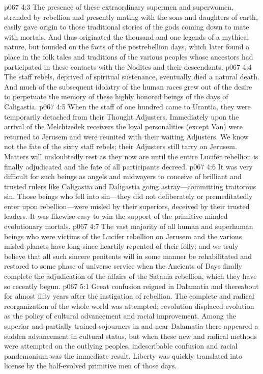 \vs p067 4:3 The presence of these extraordinary supermen and superwomen, stranded by rebellion and presently mating with the sons and daughters of earth, easily gave origin to those traditional stories of the gods coming down to mate with mortals. And thus originated the thousand and one legends of a mythical nature, but founded on the facts of the postrebellion days, which later found a place in the folk tales and traditions of the various peoples whose ancestors had participated in these contacts with the Nodites and their descendants.
\vs p067 4:4 The staff rebels, deprived of spiritual sustenance, eventually died a natural death. And much of the subsequent idolatry of the human races grew out of the desire to perpetuate the memory of these highly honored beings of the days of Caligastia.
\vs p067 4:5 When the staff of one hundred came to Urantia, they were temporarily detached from their Thought Adjusters. Immediately upon the arrival of the Melchizedek receivers the loyal personalities (except Van) were returned to Jerusem and were reunited with their waiting Adjusters. We know not the fate of the sixty staff rebels; their Adjusters still tarry on Jerusem. Matters will undoubtedly rest as they now are until the entire Lucifer rebellion is finally adjudicated and the fate of all participants decreed.
\pc \vs p067 4:6 It was very difficult for such beings as angels and midwayers to conceive of brilliant and trusted rulers like Caligastia and Daligastia going astray---committing traitorous sin. Those beings who fell into sin---they did not deliberately or premeditatedly enter upon rebellion---were misled by their superiors, deceived by their trusted leaders. It was likewise easy to win the support of the primitive\hyp{}minded evolutionary mortals.
\vs p067 4:7 The vast majority of all human and superhuman beings who were victims of the Lucifer rebellion on Jerusem and the various misled planets have long since heartily repented of their folly; and we truly believe that all such sincere penitents will in some manner be rehabilitated and restored to some phase of universe service when the Ancients of Days finally complete the adjudication of the affairs of the Satania rebellion, which they have so recently begun.
\vs p067 5:1 Great confusion reigned in Dalamatia and thereabout for almost fifty years after the instigation of rebellion. The complete and radical reorganization of the whole world was attempted; revolution displaced evolution as the policy of cultural advancement and racial improvement. Among the superior and partially trained sojourners in and near Dalamatia there appeared a sudden advancement in cultural status, but when these new and radical methods were attempted on the outlying peoples, indescribable confusion and racial pandemonium was the immediate result. Liberty was quickly translated into license by the half\hyp{}evolved primitive men of those days.
